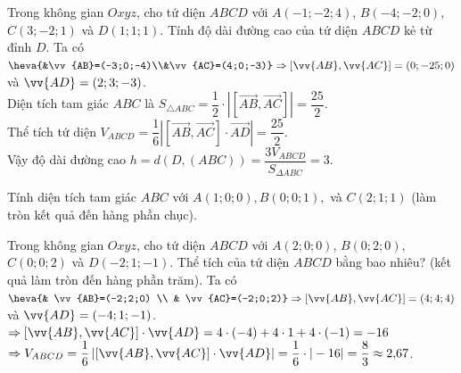 \begin{ex}[Mức độ 3]%
	Trong không gian $Oxyz$, cho tứ diện $ABCD$ với $A(-1; -2; 4)$, $B(-4; -2; 0)$, $C(3; -2; 1)$ và $D(1; 1; 1)$. Tính độ dài đường cao của tứ diện $ABCD$ kẻ từ đỉnh $D$.
	\loigiai
	{ Ta có $\heva{&\vv{AB}=(-3;0;-4)\\&\vv{AC}=(4;0;-3)}\Rightarrow \left[\vv{AB},\vv{AC}\right]=(0;-25;0)$ và $\vv{AD} = (2;3;-3)$.\\
		Diện tích tam giác $ABC$ là $S_{\triangle ABC}=\dfrac{1}{2}\cdot\left|\left[\overrightarrow{AB},\overrightarrow{AC}\right]\right|=\dfrac{25}{2}$.\\
		Thể tích tứ diện $V_{ABCD}=\dfrac{1}{6}\left|\left[\overrightarrow{AB},\overrightarrow{AC}\right]\cdot \overrightarrow{AD}\right|=\dfrac{25}{2}.$\\
		Vậy độ dài đường cao $h=d\left(D,\left(ABC\right)\right)=\dfrac{3V_{ABCD}}{S_{\Delta ABC}}=3.$	
	}
\end{ex}

\begin{ex}[Mức độ 2]%
	Tính diện tích tam giác $ ABC $ với $ A(1;0;0),B(0;0;1), $ và $ C(2;1;1) $ (làm tròn kết quả đến hàng phần chục).
\end{ex}

\begin{ex}[Mức độ 2]%
	Trong không gian $Oxyz$, cho tứ diện $ABCD$ với $A(2;0 ; 0)$, $B(0; 2; 0)$, $C(0; 0; 2)$ và $D(-2; 1; -1)$. Thể tích của tứ diện $ABCD$ bằng bao nhiêu? (kết quả làm tròn đến hàng phần trăm).
	\loigiai
	{
		Ta có $ \heva{& \vv{AB}=(-2;2;0) \\ & \vv{AC}=(-2;0;2)} \Rightarrow \left [\vv{AB},\vv{AC}\right ]=(4;4;4)$ và $\vv{AD}=(-4;1;-1) $.\\
	$ \Rightarrow \left [\vv{AB},\vv{AC}\right ]\cdot \vv{AD}=4\cdot (-4)+4 \cdot 1 + 4 \cdot (-1) = -16 $\\
	$ \Rightarrow  V_{ABCD}=\dfrac{1}{6} \left | \left [\vv{AB},\vv{AC}\right ] \cdot \vv{AD}\right | =\dfrac{1}{6} \cdot |-16|=\dfrac{8}{3}\approx 2{,}67 $.
	}
\end{ex}

